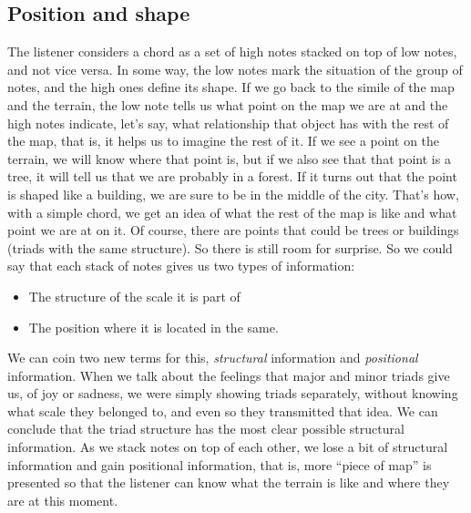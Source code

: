 \documentclass[]{report}
\providecommand{\tightlist}{%
  \setlength{\itemsep}{0pt}
  \setlength{\parskip}{0pt}
}
\begin{document}
\subsection{Position and shape}
The listener considers a chord as a set of high notes stacked on top of low notes, and not vice versa. In some way, the low notes mark the situation of the group of notes, and the high ones define its shape.
If we go back to the simile of the map and the terrain, the low note tells us what point on the map we are at and the high notes indicate, let's say, what relationship that object has with the rest of the map, that is, it helps us to imagine the rest of it.
If we see a point on the terrain, we will know where that point is, but if we also see that that point is a tree, it will tell us that we are probably in a forest. If it turns out that the point is shaped like a building, we are sure to be in the middle of the city. That's how, with a simple chord, we get an idea of what the rest of the map is like and what point we are at on it. Of course, there are points that could be trees or buildings (triads with the same structure). So there is still room for surprise.
So we could say that each stack of notes gives us two types of information:
\begin{itemize}
\tightlist
\item The structure of the scale it is part of
\item The position where it is located in the same.
\end{itemize}
We can coin two new terms for this, \emph{structural} information and \emph{positional} information. When we talk about the feelings that major and minor triads give us, of joy or sadness, we were simply showing triads separately, without knowing what scale they belonged to, and even so they transmitted that idea. We can conclude that the triad structure has the most clear possible structural information. As we stack notes on top of each other, we lose a bit of structural information and gain positional information, that is, more ``piece of map'' is presented so that the listener can know what the terrain is like and where they are at this moment.
\end{document}
